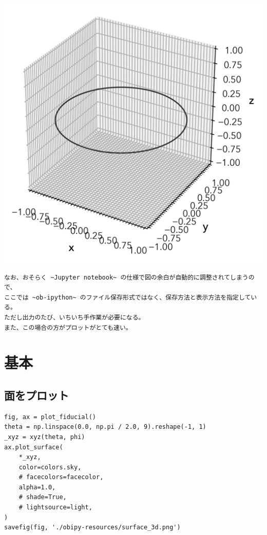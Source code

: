 \documentclass[a4paper, 10pt, notitlepage, twocolumn, uplatex, oneside, dvipdfmx]{jsarticle}
\begin{document}
\label{}
\begin{center}
\includegraphics[width=1.0\linewidth]{./obipy-resources/fiducial_3d.png}
\end{center}

\begin{verbatim}
なお、おそらく ~Jupyter notebook~ の仕様で図の余白が自動的に調整されてしまうので、
ここでは ~ob-ipython~ のファイル保存形式ではなく、保存方法と表示方法を指定している。
ただし出力のたび、いちいち手作業が必要になる。
また、この場合の方がプロットがとても速い。
\end{verbatim}
\section{基本}
\label{sec:org1ceb77d}
\subsection{面をプロット}
\label{sec:org3dfa4fd}
\begin{verbatim}
fig, ax = plot_fiducial()
theta = np.linspace(0.0, np.pi / 2.0, 9).reshape(-1, 1)
_xyz = xyz(theta, phi)
ax.plot_surface(
    *_xyz,
    color=colors.sky,
    # facecolors=facecolor,
    alpha=1.0,
    # shade=True,
    # lightsource=light,
)
savefig(fig, './obipy-resources/surface_3d.png')
\end{verbatim}
\end{document}
